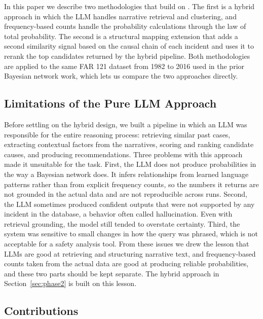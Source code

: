 \documentclass[11pt]{article}
\begin{document}
In this paper we describe two methodologies that build on \citet{ZhangMahadevan2021}. The first is a hybrid approach in which the LLM handles narrative retrieval and clustering, and frequency-based counts handle the probability calculations through the law of total probability. The second is a structural mapping extension that adds a second similarity signal based on the causal chain of each incident and uses it to rerank the top candidates returned by the hybrid pipeline. Both methodologies are applied to the same FAR 121 dataset from 1982 to 2016 used in the prior Bayesian network work, which lets us compare the two approaches directly.

\subsection{Limitations of the Pure LLM Approach}
\label{sec:intro:phase1}

Before settling on the hybrid design, we built a pipeline in which an LLM was responsible for the entire reasoning process: retrieving similar past cases, extracting contextual factors from the narratives, scoring and ranking candidate causes, and producing recommendations. Three problems with this approach made it unsuitable for the task. First, the LLM does not produce probabilities in the way a Bayesian network does. It infers relationships from learned language patterns rather than from explicit frequency counts, so the numbers it returns are not grounded in the actual data and are not reproducible across runs. Second, the LLM sometimes produced confident outputs that were not supported by any incident in the database, a behavior often called hallucination. Even with retrieval grounding, the model still tended to overstate certainty. Third, the system was sensitive to small changes in how the query was phrased, which is not acceptable for a safety analysis tool. From these issues we drew the lesson that LLMs are good at retrieving and structuring narrative text, and frequency-based counts taken from the actual data are good at producing reliable probabilities, and these two parts should be kept separate. The hybrid approach in Section~\ref{sec:phase2} is built on this lesson.

\subsection{Contributions}
\end{document}

